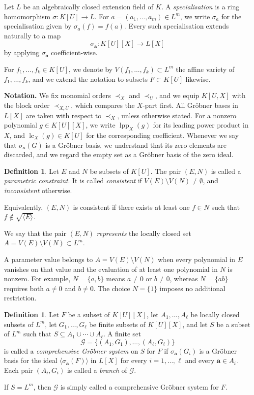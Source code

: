 \documentclass[11pt]{amsart}
\theoremstyle{plain}
\theoremstyle{definition}
\newtheorem{definition}[theorem]{Definition}
\theoremstyle{remark}
\begin{document}
Let $L$ be an algebraically closed extension field of $K$.
A \emph{specialisation} is a ring homomorphism
$\sigma:K[U]\to L$.
For $a=(a_1,\ldots,a_m)\in L^m$, we write
$\sigma_{a}$ for the specialisation given by
$\sigma_{a}(f)=f(a)$.
Every such specialisation extends naturally to a map
\[
\sigma_{\mathbf{a}}:K[U][X]\longrightarrow L[X]
\]
by applying $\sigma_{\mathbf{a}}$ coefficient-wise.

For $f_1,\ldots,f_k\in K[U]$, we denote by $V(f_1,\ldots,f_k)\subset L^m$ the affine variety of $f_1,\ldots,f_k$, and we extend the notation to subsets $F\subset K[U]$ likewise.

\textbf{Notation.} We fix monomial orders $\prec_X$ and $\prec_U$, and we equip $K[U,X]$ with the block order $\prec_{X,U}$, which compares the $X$-part first. All Gr\"obner bases in $L[X]$ are taken with respect to
$\prec_X$, unless otherwise stated. For a nonzero polynomial $g\in K[U][X]$, we write $\operatorname{lpp}_X(g)$ for its leading power product in $X$, and $\operatorname{lc}_X(g)\in K[U]$ for the corresponding coefficient.
Whenever we say that $\sigma_{a}(G)$ is a Gröbner basis, we understand that its zero elements are discarded, and we regard the empty set as a Gröbner basis of the zero ideal.


\begin{definition}
Let $E$ and $N$ be subsets of $K[U]$. The pair $(E,N)$ is called a \emph{parametric constraint}. It is called \emph{consistent} if $V(E)\setminus V(N)\neq\emptyset$, and \emph{inconsistent} otherwise.

Equivalently, $(E,N)$ is consistent if there exists at least one $f\in N$ such that
$f\notin\sqrt{\langle E\rangle}$.

 We say that the pair $(E,N)$ \emph{represents} the locally closed set $A=V(E)\setminus V(N)\subset L^m$.
\end{definition}


A parameter value belongs to $A=V(E)\setminus V(N)$ when every polynomial in $E$ vanishes on that value and the evaluation of at least one polynomial in $N$ is nonzero. For example, $N=\lbrace a,b\rbrace$ means $a\neq 0$ or $b\neq 0$, whereas $N=\lbrace ab\rbrace$ requires both $a\neq 0$ and $b\neq 0$. The choice $N=\lbrace 1\rbrace$ imposes no additional restriction.

\begin{definition}
Let $F$ be a subset of $K[U][X]$, let $A_1,\ldots,A_\ell$ be locally closed subsets of $L^m$,
let $G_1,\ldots,G_\ell$ be finite subsets of $K[U][X]$, and let $S$ be a subset of $L^m$ such that $S \subseteq A_1 \cup \cdots \cup A_\ell$. A finite set
\[
\mathcal{G} = \{(A_1,G_1),\ldots,(A_\ell,G_\ell)\}
\]
is called a \emph{comprehensive Gr\"obner system} on $S$ for $F$ if $\sigma_{\mathbf{a}}(G_i)$ is a Gr\"obner basis for the ideal $\langle \sigma_{\mathbf{a}}(F)\rangle$ in $L[X]$ for every $i=1,\ldots,\ell$ and every $\mathbf{a}\in A_i$.
Each pair $(A_i,G_i)$ is called a \emph{branch} of $\mathcal{G}$.

If $S=L^m$, then $\mathcal{G}$ is simply called a comprehensive Gr\"obner system for $F$.
\end{definition}
\end{document}
